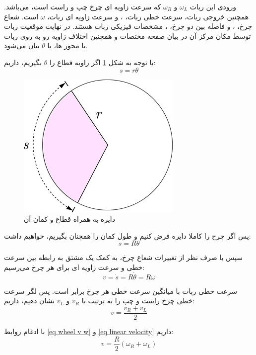 ورودی این ربات $\omega_L$ و $\omega_R$ که سرعت زاویه ای چرخ چپ و راست است، می‌باشد. همچنین خروجی ربات، سرعت خطی ربات، 
، و سرعت زاویه ای ربات، $\omega$ است. شعاع چرخ، 
، و فاصله بین دو چرخ، 
، مشخصات فیزیکی ربات هستند. در نهایت موقعیت ربات توسط مکان مرکز آن در بیان صفحه مختصات 
 و همچنین اختلاف زاویه رو به روی ربات با محور 
   ها، با $\theta$ بیان می‌شود.

با توجه به شکل \ref{Fig circle-arc} اگر زاویه قطاع را $\theta$ بگیریم، داریم:
\begin{equation}
s = r\theta
\end{equation}

\begin{figure}[!h] 
	\centering
	\includegraphics[scale=2]{Images/Circle_arc2.jpg}
	\caption{دایره به همراه قطاع و کمان آن} \label{Fig circle-arc}
\end{figure}

پس اگر چرح را کاملا دایره فرض کنیم و طول کمان را همچنان  بگیریم، خواهیم داشت:
\begin{equation}
s = R\theta
\end{equation}

سپس با صرف نظر از تغییرات شعاع چرخ، به کمک یک مشتق به رابطه بین سرعت خطی و سرعت زاویه ای برای هر چرخ می‌رسیم:
\begin{equation} \label{eq wheel v w}
v = \dot{s} = R\dot{\theta} = R\omega
\end{equation}

سرعت خطی ربات با میانگین سرعت خطی هر چرخ برابر است. پس لگر سرعت خطی چرخ راست و چپ را به ترتیب با $v_{R}$ و $v_{L}$ نشان دهیم، داریم:
\begin{equation} \label{eq linear velocity}
v = \frac{v_R + v_L}{2}
\end{equation}

با ادغام روابط \ref{eq wheel v w} و \ref{eq linear velocity} داریم:
\begin{equation} \label{eq forward kinematics v}
v = \frac{R}{2}(\omega_R + \omega_L)
\end{equation}

